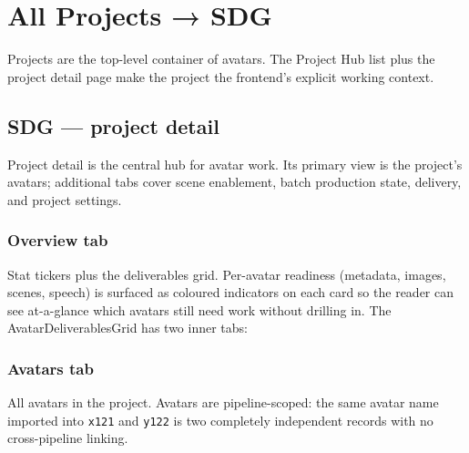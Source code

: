 \section{All Projects → SDG}
\label{sec:ws-projects}

Projects are the top-level container of avatars. The Project Hub list plus the
project detail page make the project the frontend's explicit working context.



\subsection{SDG — project detail}

Project detail is the central hub for avatar work. Its primary view is the
project's avatars; additional tabs cover scene enablement, batch production
state, delivery, and project settings.


\begin{itemize}
\end{itemize}

\subsubsection{Overview tab}
Stat tickers plus the deliverables grid. Per-avatar readiness (metadata, images,
scenes, speech) is surfaced as coloured indicators on each card so the reader
can see at-a-glance which avatars still need work without drilling in.
The AvatarDeliverablesGrid has two inner tabs:

\subsubsection{Avatars tab}
All avatars in the project. Avatars are pipeline-scoped: the same avatar name
imported into \texttt{x121} and \texttt{y122} is two completely independent
records with no cross-pipeline linking.

